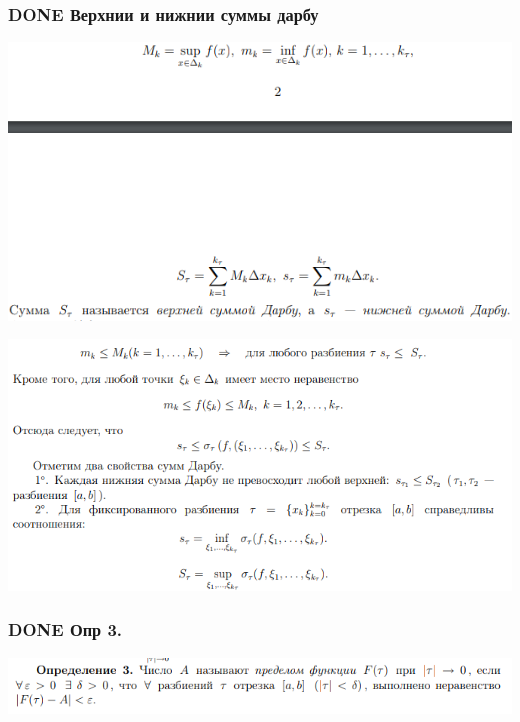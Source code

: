 \documentclass[11pt]{article}
\begin{document}
\subsubsection{{\bfseries\sffamily DONE} Верхнии и нижнии суммы дарбу}
\label{sec:org99ced1f}
\begin{center}
\includegraphics[width=.9\linewidth]{img/b2-sumDarbu1.png}
\end{center}

\begin{center}
\includegraphics[width=.9\linewidth]{img/b2-sumDarbu2.png}
\end{center}
\subsubsection{{\bfseries\sffamily DONE} Опр 3.}
\label{sec:orgfd7f0d2}
\begin{center}
\includegraphics[width=.9\linewidth]{img/b2-opr3.png}
\end{center}
\end{document}
